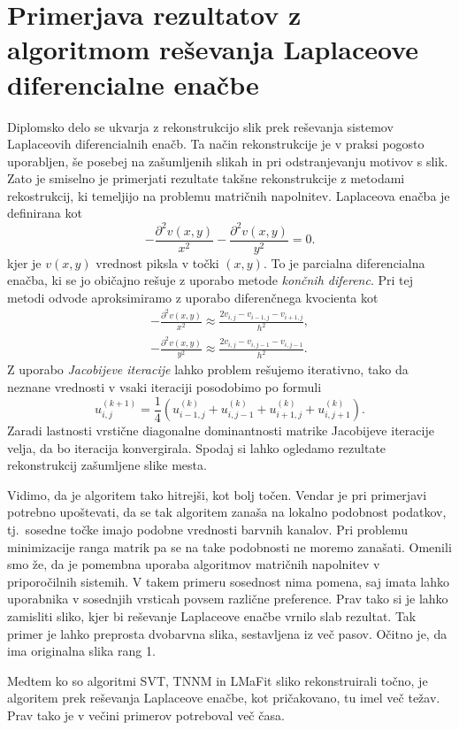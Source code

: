 \section{Primerjava rezultatov z algoritmom re\-še\-van\-ja Laplaceove diferencialne enačbe} \label{1307-2255}
Diplomsko delo \cite{ERZAR_2023} se ukvarja z rekonstrukcijo slik prek reševanja sistemov Laplaceovih diferencialnih enačb.
Ta način rekonstrukcije je v praksi pogosto uporabljen, še posebej na zašumljenih slikah in pri odstranjevanju motivov s slik. Zato je smiselno je primerjati rezultate takšne rekonstrukcije z metodami rekostrukcij, ki temeljijo na problemu matričnih napolnitev.  Laplaceova enačba je definirana kot
\[
    -\frac{\partial^2v(x, y)}{x^2} - \frac{\partial^2v(x, y)}{y^2} = 0.
\]
kjer je $v(x,y)$ vrednost piksla v točki $(x, y)$. To je parcialna diferencialna enačba, ki se jo običajno rešuje z uporabo metode \textit{končnih diferenc}. Pri tej metodi odvode aproksimiramo z uporabo diferenčnega kvocienta kot
\begin{align*}
    -\frac{\partial^2v(x, y)}{x^2} \approx \frac{2v_{i,j} - v_{i-1, j} - v_{i+1, j}}{h^2}, \\
    -\frac{\partial^2v(x, y)}{y^2} \approx \frac{2v_{i,j} - v_{i, j-1} - v_{i, j-1}}{h^2}.
\end{align*}
Z uporabo \textit{Jacobijeve iteracije} \cite[pogl. 6]{demmel97} lahko problem rešujemo iterativno, tako da neznane vrednosti v vsaki iteraciji posodobimo po formuli
\[
    u_{i, j}^{(k+1)} = \frac{1}{4}(u_{i - 1, j}^{(k)} +  u_{i, j - 1}^{(k)} + u_{i + 1, j}^{(k)} + u_{i, j + 1}^{(k)}).
\]
Zaradi lastnosti vrstične diagonalne dominantnosti matrike Jacobijeve iteracije velja, da bo iteracija konvergirala. Spodaj si lahko ogledamo rezultate rekonstrukcij zašumljene slike mesta.

\FloatBarrier
Vidimo, da je algoritem tako hitrejši, kot bolj točen. Vendar je pri primerjavi potrebno upoštevati, da se tak algoritem zanaša na lokalno podobnost podatkov, tj.\ sosedne točke imajo podobne vrednosti barvnih kanalov. Pri problemu minimizacije ranga matrik pa se na take podobnosti ne moremo zanašati. Omenili smo že, da je pomembna uporaba algoritmov matričnih napolnitev v priporočilnih sistemih. V takem primeru sosednost nima pomena, saj imata lahko uporabnika v sosednjih vrsticah povsem različne preference. Prav tako si je lahko zamisliti sliko, kjer bi reševanje Laplaceove enačbe vrnilo slab rezultat. Tak primer je lahko preprosta dvobarvna slika, sestavljena iz več pasov. Očitno je, da ima originalna slika rang 1.

Medtem ko so algoritmi SVT, TNNM in LMaFit sliko rekonstruirali točno, je algoritem prek reševanja Laplaceove enačbe, kot pričakovano, tu imel več težav. Prav tako je v večini primerov potreboval več časa.

